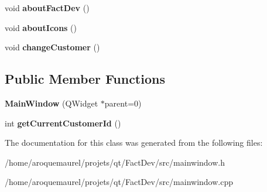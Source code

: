 \begin{DoxyCompactItemize}
\item 
\hypertarget{classMainWindow_af9af9644d45d2af769d18f2370eed83e}{void {\bfseries about\-Fact\-Dev} ()}\label{classMainWindow_af9af9644d45d2af769d18f2370eed83e}

\item 
\hypertarget{classMainWindow_ae6a7598b9931ca8901a62bb95c490e0e}{void {\bfseries about\-Icons} ()}\label{classMainWindow_ae6a7598b9931ca8901a62bb95c490e0e}

\item 
\hypertarget{classMainWindow_afa850634f7968a6e9803a25e905f3178}{void {\bfseries change\-Customer} ()}\label{classMainWindow_afa850634f7968a6e9803a25e905f3178}

\end{DoxyCompactItemize}
\subsection*{Public Member Functions}
\begin{DoxyCompactItemize}
\item 
\hypertarget{classMainWindow_a8b244be8b7b7db1b08de2a2acb9409db}{{\bfseries Main\-Window} (Q\-Widget $\ast$parent=0)}\label{classMainWindow_a8b244be8b7b7db1b08de2a2acb9409db}

\item 
\hypertarget{classMainWindow_a0584b17eb78c07b513524a09bd914042}{int {\bfseries get\-Current\-Customer\-Id} ()}\label{classMainWindow_a0584b17eb78c07b513524a09bd914042}

\end{DoxyCompactItemize}


The documentation for this class was generated from the following files\-:\begin{DoxyCompactItemize}
\item 
/home/aroquemaurel/projets/qt/\-Fact\-Dev/src/mainwindow.\-h\item 
/home/aroquemaurel/projets/qt/\-Fact\-Dev/src/mainwindow.\-cpp\end{DoxyCompactItemize}
